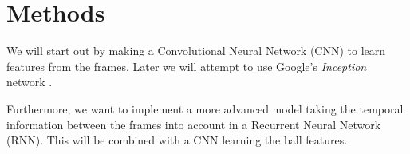 
\section{Methods}

We will start out by making a Convolutional Neural Network (CNN) to learn features from the frames.
Later we will attempt to use Google's \textit{Inception} network \cite{inception}.

Furthermore, we want to implement a more advanced model taking the temporal information between the frames into account in a Recurrent Neural Network (RNN). This will be combined with a CNN learning the ball features.